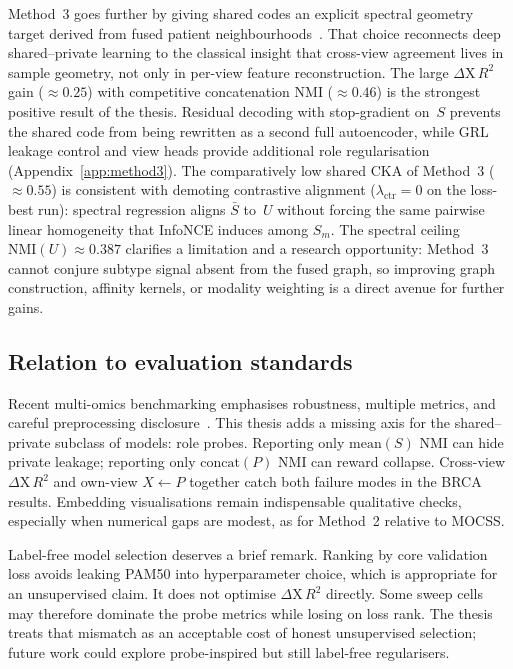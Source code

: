 Method~3 goes further by giving shared codes an explicit spectral geometry target derived from fused patient neighbourhoods~\citep{wang2014snf,ng2002spectral,vonluxburg2007tutorial}. That choice reconnects deep shared--private learning to the classical insight that cross-view agreement lives in sample geometry, not only in per-view feature reconstruction. The large $\Delta\mathrm{X}\,R^{2}$ gain ($\approx0.25$) with competitive concatenation NMI ($\approx0.46$) is the strongest positive result of the thesis. Residual decoding with stop-gradient on~$S$ prevents the shared code from being rewritten as a second full autoencoder, while GRL leakage control and view heads provide additional role regularisation (Appendix~\ref{app:method3}). The comparatively low shared CKA of Method~3 ($\approx0.55$) is consistent with demoting contrastive alignment ($\lambda_{\mathrm{ctr}}=0$ on the loss-best run): spectral regression aligns $\bar{S}$ to~$U$ without forcing the same pairwise linear homogeneity that InfoNCE induces among $S_m$. The spectral ceiling $\mathrm{NMI}(U)\approx0.387$ clarifies a limitation and a research opportunity: Method~3 cannot conjure subtype signal absent from the fused graph, so improving graph construction, affinity kernels, or modality weighting is a direct avenue for further gains.

\subsection{Relation to evaluation standards}

Recent multi-omics benchmarking emphasises robustness, multiple metrics, and careful preprocessing disclosure~\citep{cantini2021benchmarking,rappoport2021evaluation,baiao2025technical,mohr2024navigating}. This thesis adds a missing axis for the shared--private subclass of models: role probes. Reporting only $\mathrm{mean}(S)$ NMI can hide private leakage; reporting only $\mathrm{concat}(P)$ NMI can reward collapse. Cross-view $\Delta\mathrm{X}\,R^{2}$ and own-view $X\leftarrow P$ together catch both failure modes in the BRCA results. Embedding visualisations remain indispensable qualitative checks, especially when numerical gaps are modest, as for Method~2 relative to MOCSS.

Label-free model selection deserves a brief remark. Ranking by core validation loss avoids leaking PAM50 into hyperparameter choice, which is appropriate for an unsupervised claim. It does not optimise $\Delta\mathrm{X}\,R^{2}$ directly. Some sweep cells may therefore dominate the probe metrics while losing on loss rank. The thesis treats that mismatch as an acceptable cost of honest unsupervised selection; future work could explore probe-inspired but still label-free regularisers.

